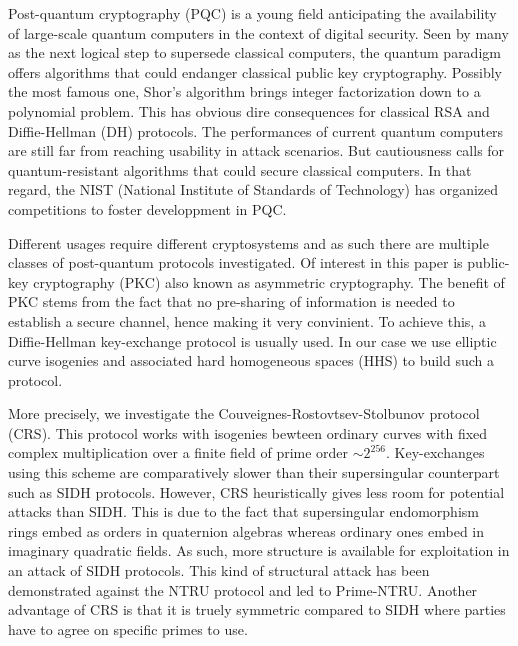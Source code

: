 \documentclass[../main.tex]{subfiles}
\begin{document}
Post-quantum cryptography (PQC) is a young field anticipating the availability of large-scale quantum computers in the context of digital security.
Seen by many as the next logical step to supersede classical computers, the quantum paradigm offers algorithms that could endanger classical public key cryptography.
Possibly the most famous one, Shor's algorithm \cite{} brings integer factorization down to a polynomial problem.
This has obvious dire consequences for classical RSA and Diffie-Hellman (DH) protocols.
The performances of current quantum computers are still far from reaching usability in attack scenarios.
But cautiousness calls for quantum-resistant algorithms that could secure classical computers.
In that regard, the NIST (National Institute of Standards of Technology) has organized competitions to foster developpment in PQC.

Different usages require different cryptosystems and as such there are multiple classes of post-quantum protocols investigated.
Of interest in this paper is public-key cryptography (PKC) also known as asymmetric cryptography.
The benefit of PKC stems from the fact that no pre-sharing of information is needed to establish a secure channel, hence making it very convinient.
To achieve this, a Diffie-Hellman key-exchange protocol is usually used.
In our case we use elliptic curve isogenies and associated hard homogeneous spaces (HHS) to build such a protocol.

More precisely, we investigate the Couveignes-Rostovtsev-Stolbunov protocol (CRS).
This protocol works with isogenies bewteen ordinary curves with fixed complex multiplication over a finite field of prime order $\sim 2^{256}$.
Key-exchanges using this scheme are comparatively slower than their supersingular counterpart such as SIDH protocols.
However, CRS heuristically gives less room for potential attacks than SIDH.
This is due to the fact that supersingular endomorphism rings embed as orders in quaternion algebras whereas ordinary ones embed in imaginary quadratic fields.
As such, more structure is available for exploitation in an attack of SIDH protocols.
This kind of structural attack has been demonstrated against the NTRU protocol and led to Prime-NTRU.
Another advantage of CRS is that it is truely symmetric compared to SIDH where parties have to agree on specific primes to use.
\end{document}

